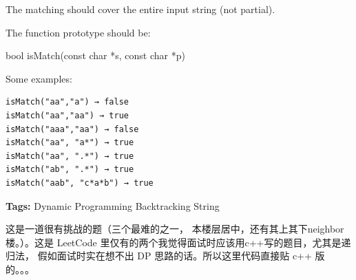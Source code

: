 \documentclass[12pt]{book}
\begin{document}
The matching should cover the entire input string (not partial).

The function prototype should be:

bool isMatch(const char *s, const char *p)

Some examples:
\lstset{language=java,label= ,caption= ,numbers=none}
\begin{lstlisting}
isMatch("aa","a") → false
isMatch("aa","aa") → true
isMatch("aaa","aa") → false
isMatch("aa", "a*") → true
isMatch("aa", ".*") → true
isMatch("ab", ".*") → true
isMatch("aab", "c*a*b") → true
\end{lstlisting}

\textbf{Tags:} Dynamic Programming Backtracking String

这是一道很有挑战的题（三个最难的之一， 本楼层居中，还有其上其下neighbor楼。）。这是 LeetCode 里仅有的两个我觉得面试时应该用c++写的题目，尤其是递归法，
假如面试时实在想不出 DP 思路的话。所以这里代码直接贴 c++ 版的。。。
\end{document}
